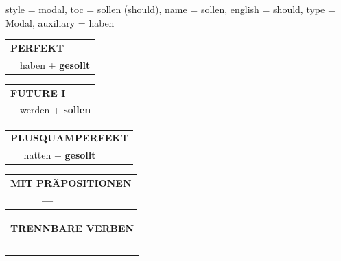 \begin{verbentry}{
  style = {modal},
  toc = {sollen (should)},
  name = {sollen},
  english = {should},
  type = {Modal},
  auxiliary = {haben}
}
    \vspace{10pt}
 
    \begin{tabular}{rl}
     \multicolumn{2}{l}{\textbf{PERFEKT}}\\
  &  haben + \textbf{gesollt}\\
  \end{tabular}
\hfill
   \begin{tabular}{rl}
   
    \multicolumn{2}{l}{\textbf{FUTURE I} }\\
  &  werden + \textbf{sollen}\\
 
  \end{tabular}
\hfill
   \begin{tabular}{rl}
      \multicolumn{2}{l}{\textbf{PLUSQUAMPERFEKT}}\\
  &  hatten + \textbf{gesollt}\\
  \end{tabular}
  
  
\vspace{10pt}

\begin{tabular}{lll}
\multicolumn{3}{l}{\textbf{MIT PRÄPOSITIONEN}}\\
& \textbf{---} & \\
\end{tabular}
\hfill
\begin{tabular}{lll}
\multicolumn{3}{l}{\textbf{TRENNBARE VERBEN}}\\
& \textbf{---} & \\
\end{tabular}
\vspace{-5pt}
\end{verbentry}

